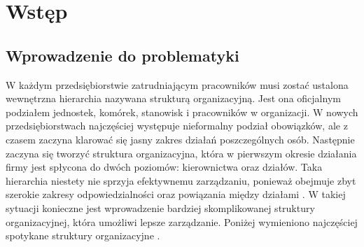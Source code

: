 
\chapter{Wstęp}
\label{ch:wstep}

\section{Wprowadzenie do problematyki}

W każdym przedsiębiorstwie zatrudniającym pracowników musi zostać ustalona wewnętrzna hierarchia nazywana strukturą organizacyjną. Jest ona oficjalnym podziałem jednostek, komórek, stanowisk i pracowników w organizacji. W nowych przedsiębiorstwach najczęściej występuje nieformalny podział obowiązków, ale z czasem zaczyna klarować się jasny zakres działań poszczególnych osób. Następnie zaczyna się tworzyć struktura organizacyjna, która w pierwszym okresie działania firmy jest spłycona do dwóch poziomów: kierownictwa oraz działów. Taka hierarchia niestety nie sprzyja efektywnemu zarządzaniu, ponieważ obejmuje zbyt szerokie zakresy odpowiedzialności oraz powiązania między działami \cite{bib:zarzadzanie}. W takiej sytuacji konieczne jest wprowadzenie bardziej skomplikowanej struktury organizacyjnej, która umożliwi lepsze zarządzanie. Poniżej wymieniono najczęściej spotykane struktury organizacyjne \cite{bib:StrukturaOrganizacyjna}.

